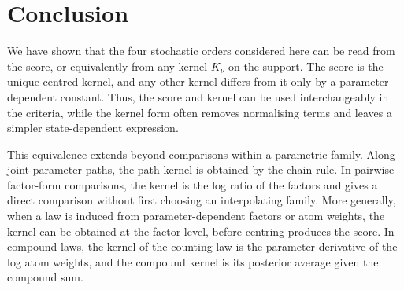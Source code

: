\documentclass[11pt]{article}
\begin{document}

\section{Conclusion}
\label{sec:discussion}

We have shown that the four stochastic orders considered here can be read from the score, or equivalently from any kernel \(K_\nu\) on the support. The score is the unique centred kernel, and any other kernel differs from it only by a parameter-dependent constant. Thus, the score and kernel can be used interchangeably in the criteria, while the kernel form often removes normalising terms and leaves a simpler state-dependent expression.

This equivalence extends beyond comparisons within a parametric family. Along joint-parameter paths, the path kernel is obtained by the chain rule. In pairwise factor-form comparisons, the kernel is the log ratio of the factors and gives a direct comparison without first choosing an interpolating family. More generally, when a law is induced from parameter-dependent factors or atom weights, the kernel can be obtained at the factor level, before centring produces the score. In compound laws, the kernel of the counting law is the parameter derivative of the log atom weights, and the compound kernel is its posterior average given the compound sum.


\printbibliography
\end{document}
